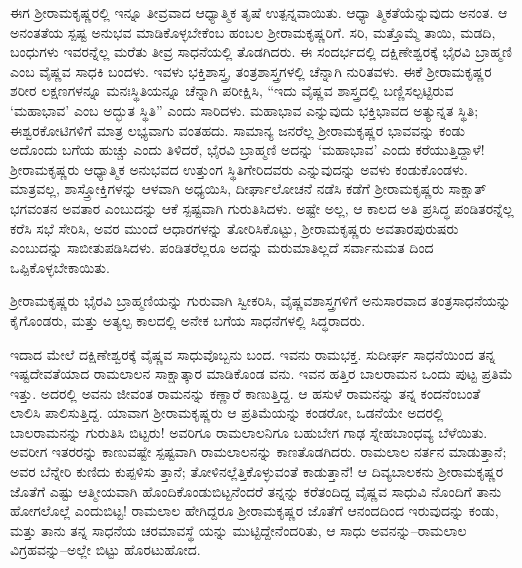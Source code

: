 ಈಗ ಶ್ರೀರಾಮಕೃಷ್ಣರಲ್ಲಿ ಇನ್ನೂ ತೀವ್ರವಾದ ಆಧ್ಯಾತ್ಮಿಕ ತೃಷೆ ಉತ್ಪನ್ನವಾಯಿತು. ಆಧ್ಯಾ ತ್ಮಿಕತೆಯೆನ್ನುವುದು ಅನಂತ. ಆ ಅನಂತತೆಯ ಸ್ಪಷ್ಟ ಅನುಭವ ಮಾಡಿಕೊಳ್ಳಬೇಕೆಂಬ ಹಂಬಲ ಶ್ರೀರಾಮಕೃಷ್ಣರಿಗೆ. ಸರಿ, ಮತ್ತೊಮ್ಮೆ ತಾಯಿ, ಮಡದಿ, ಬಂಧುಗಳು ಇವರನ್ನೆಲ್ಲ ಮರೆತು ತೀವ್ರ ಸಾಧನೆಯಲ್ಲಿ ತೊಡಗಿದರು. ಈ ಸಂದರ್ಭದಲ್ಲಿ ದಕ್ಷಿಣೇಶ್ವರಕ್ಕೆ ಭೈರವಿ ಬ್ರಾಹ್ಮಣಿ ಎಂಬ ವೈಷ್ಣವ ಸಾಧಕಿ ಬಂದಳು. ಇವಳು ಭಕ್ತಿಶಾಸ್ತ್ರ, ತಂತ್ರಶಾಸ್ತ್ರಗಳಲ್ಲಿ ಚೆನ್ನಾಗಿ ನುರಿತವಳು. ಈಕೆ ಶ್ರೀರಾಮಕೃಷ್ಣರ ಶರೀರ ಲಕ್ಷಣಗಳನ್ನೂ ಮನಃಸ್ಥಿತಿಯನ್ನೂ ಚೆನ್ನಾಗಿ ಪರೀಕ್ಷಿಸಿ, “ಇದು ವೈಷ್ಣವ ಶಾಸ್ತ್ರದಲ್ಲಿ ಬಣ್ಣಿಸಲ್ಪಟ್ಟಿರುವ ‘ಮಹಾಭಾವ’ ಎಂಬ ಅದ್ಭುತ ಸ್ಥಿತಿ” ಎಂದು ಸಾರಿದಳು. ಮಹಾಭಾವ ಎನ್ನುವುದು ಭಕ್ತಿಭಾವದ ಅತ್ಯುನ್ನತ ಸ್ಥಿತಿ; ಈಶ್ವರಕೋಟಿಗಳಿಗೆ ಮಾತ್ರ ಲಭ್ಯವಾಗು ವಂತಹದು. ಸಾಮಾನ್ಯ ಜನರೆಲ್ಲ ಶ್ರೀರಾಮಕೃಷ್ಣರ ಭಾವವನ್ನು ಕಂಡು ಅದೊಂದು ಬಗೆಯ ಹುಚ್ಚು ಎಂದು ತಿಳಿದರೆ, ಭೈರವಿ ಬ್ರಾಹ್ಮಣಿ ಅದನ್ನು ‘ಮಹಾಭಾವ’ ಎಂದು ಕರೆಯುತ್ತಿದ್ದಾಳೆ! ಶ್ರೀರಾಮಕೃಷ್ಣರು ಆಧ್ಯಾತ್ಮಿಕ ಅನುಭವದ ಉತ್ತುಂಗ ಸ್ಥಿತಿಗೇರಿದವರು ಎನ್ನುವುದನ್ನು ಅವಳು ಕಂಡುಕೊಂಡಳು. ಮಾತ್ರವಲ್ಲ, ಶಾಸ್ತ್ರೋಕ್ತಿಗಳನ್ನು ಆಳವಾಗಿ ಅಧ್ಯಯಿಸಿ, ದೀರ್ಘಾಲೋಚನೆ ನಡೆಸಿ ಕಡೆಗೆ ಶ್ರೀರಾಮಕೃಷ್ಣರು ಸಾಕ್ಷಾತ್ ಭಗವಂತನ ಅವತಾರ ಎಂಬುದನ್ನು ಆಕೆ ಸ್ಪಷ್ಟವಾಗಿ ಗುರುತಿಸಿದಳು. ಅಷ್ಟೇ ಅಲ್ಲ, ಆ ಕಾಲದ ಅತಿ ಪ್ರಸಿದ್ಧ ಪಂಡಿತರನ್ನೆಲ್ಲ ಕರೆಸಿ ಸಭೆ ಸೇರಿಸಿ, ಅವರ ಮುಂದೆ ಆಧಾರಗಳನ್ನು ತೋರಿಸಿಕೊಟ್ಟು, ಶ್ರೀರಾಮಕೃಷ್ಣರು ಅವತಾರಪುರುಷರು ಎಂಬುದನ್ನು ಸಾಬೀತುಪಡಿಸಿದಳು. ಪಂಡಿತರೆಲ್ಲರೂ ಅದನ್ನು ಮರುಮಾತಿಲ್ಲದೆ ಸರ್ವಾನುಮತ ದಿಂದ ಒಪ್ಪಿಕೊಳ್ಳಬೇಕಾಯಿತು.

ಶ್ರೀರಾಮಕೃಷ್ಣರು ಭೈರವಿ ಬ್ರಾಹ್ಮಣಿಯನ್ನು ಗುರುವಾಗಿ ಸ್ವೀಕರಿಸಿ, ವೈಷ್ಣವಶಾಸ್ತ್ರಗಳಿಗೆ ಅನುಸಾರವಾದ ತಂತ್ರಸಾಧನೆಯನ್ನು ಕೈಗೊಂಡರು, ಮತ್ತು ಅತ್ಯಲ್ಪ ಕಾಲದಲ್ಲಿ ಅನೇಕ ಬಗೆಯ ಸಾಧನೆಗಳಲ್ಲಿ ಸಿದ್ಧರಾದರು.

ಇದಾದ ಮೇಲೆ ದಕ್ಷಿಣೇಶ್ವರಕ್ಕೆ ವೈಷ್ಣವ ಸಾಧುವೊಬ್ಬನು ಬಂದ. ಇವನು ರಾಮಭಕ್ತ. ಸುದೀರ್ಘ ಸಾಧನೆಯಿಂದ ತನ್ನ ಇಷ್ಟದೇವತೆಯಾದ ರಾಮಲಾಲನ ಸಾಕ್ಷಾತ್ಕಾರ ಮಾಡಿಕೊಂಡ ವನು. ಇವನ ಹತ್ತಿರ ಬಾಲರಾಮನ ಒಂದು ಪುಟ್ಟ ಪ್ರತಿಮೆ ಇತ್ತು. ಅದರಲ್ಲಿ ಅವನು ಜೀವಂತ ರಾಮನನ್ನು ಕಣ್ಣಾರೆ ಕಾಣುತ್ತಿದ್ದ. ಆ ಹಸುಳೆ ರಾಮನನ್ನು ತನ್ನ ಕಂದನೆಂಬಂತೆ ಲಾಲಿಸಿ ಪಾಲಿಸುತ್ತಿದ್ದ. ಯಾವಾಗ ಶ್ರೀರಾಮಕೃಷ್ಣರು ಆ ಪ್ರತಿಮೆಯನ್ನು ಕಂಡರೋ, ಒಡನೆಯೇ ಅದರಲ್ಲಿ ಬಾಲರಾಮನನ್ನು ಗುರುತಿಸಿ ಬಿಟ್ಟರು! ಅವರಿಗೂ ರಾಮಲಾಲನಿಗೂ ಬಹುಬೇಗ ಗಾಢ ಸ್ನೇಹಬಾಂಧವ್ಯ ಬೆಳೆಯಿತು. ಅವರೀಗ ಇತರರನ್ನು ಕಾಣುವಷ್ಟೇ ಸ್ಪಷ್ಟವಾಗಿ ರಾಮಲಾಲನನ್ನು ಕಾಣತೊಡಗಿದರು. ರಾಮಲಾಲ ನರ್ತನ ಮಾಡುತ್ತಾನೆ; ಅವರ ಬೆನ್ನೇರಿ ಕುಣಿದು ಕುಪ್ಪಳಿಸು ತ್ತಾನೆ; ತೋಳಿನಲ್ಲೆತ್ತಿಕೊಳ್ಳುವಂತೆ ಕಾಡುತ್ತಾನೆ! ಆ ದಿವ್ಯಬಾಲಕನು ಶ್ರೀರಾಮಕೃಷ್ಣರ ಜೊತೆಗೆ ಎಷ್ಟು ಆತ್ಮೀಯವಾಗಿ ಹೊಂದಿಕೊಂಡುಬಿಟ್ಟನೆಂದರೆ ತನ್ನನ್ನು ಕರೆತಂದಿದ್ದ ವೈಷ್ಣವ ಸಾಧುವಿ ನೊಂದಿಗೆ ತಾನು ಹೋಗಲೊಲ್ಲೆ ಎಂದುಬಿಟ್ಟ! ರಾಮಲಾಲ ಹೇಗಿದ್ದರೂ ಶ್ರೀರಾಮಕೃಷ್ಣರ ಜೊತೆಗೆ ಆನಂದದಿಂದ ಇರುವುದನ್ನು ಕಂಡು, ಮತ್ತು ತಾನು ತನ್ನ ಸಾಧನೆಯ ಚರಮಾವಸ್ಥೆ ಯನ್ನು ಮುಟ್ಟಿದ್ದೇನೆಂದರಿತು, ಆ ಸಾಧು ಅವನನ್ನು–ರಾಮಲಾಲ ವಿಗ್ರಹವನ್ನು–ಅಲ್ಲೇ ಬಿಟ್ಟು ಹೊರಟುಹೋದ.

